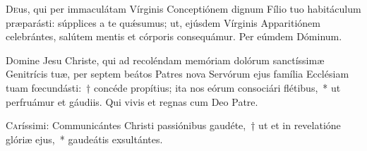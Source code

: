 \documentclass[vesperale_romanum.tex]{subfiles}
\begin{document}
\admagnificat


\oratio

\lettrine{D}{e}us, qui per immaculátam Vírginis Conceptiónem dignum Fílio tuo habitáculum præparásti: súpplices a te quǽsumus; ut, ejúsdem Vírginis Apparitiónem celebrántes, salútem mentis et córporis consequámur.
Per eúmdem Dóminum.

\bmvtone


\omniapraeter

\hymnus


\admagnificat



\myrule



\duplex




\admagnificat


\oratio

\lettrine{D}{o}mine Jesu Christe, qui ad recoléndam memóriam dolórum san\-ctíssimæ Genitrícis tuæ, per septem beátos Patres nova Servórum ejus família Ecclésiam tuam fœcundásti:~† concéde propítius; ita nos eórum consociári flétibus,~* ut perfruámur et gáudiis. Qui vivis et regnas cum Deo Patre.

\quadcommferiae



\lettrine{C}{a}ríssimi: Communicántes Christi passiónibus gaudéte,~† ut et in revelatióne glóriæ ejus,~* gaudeátis exsultántes.

\hymnus
\end{document}

